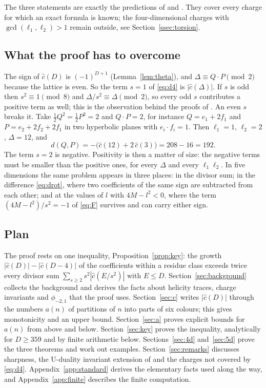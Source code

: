 \documentclass[11pt]{amsart}
\theoremstyle{definition}
\newcommand{\cc}{\hat c}
\begin{document}
The three statements are exactly the predictions of \cite[\S5]{BM13} and \cite[(5.30)]{Sen12}. They cover every charge for which an exact formula is known; the four-dimensional charges with $\gcd(\ell_1,\ell_2)>1$ remain outside, see Section~\ref{ssec:torsion}.

\subsection*{What the proof has to overcome}
The sign of $\cc(D)$ is $(-1)^{D+1}$ (Lemma~\ref{lem:theta}), and $\Delta\equiv Q\cdot P\pmod 2$ because the lattice is even. So the term $s=1$ of \eqref{eq:d4} is $|\cc(\Delta)|$. If $s$ is odd then $s^2\equiv1\pmod 8$ and $\Delta/s^2\equiv\Delta\pmod 2$, so every odd $s$ contributes a positive term as well; this is the observation behind the proofs of \cite{BM13}. An even $s$ breaks it. Take $\tfrac12Q^2=\tfrac12P^2=2$ and $Q\cdot P=2$, for instance $Q=e_1+2f_1$ and $P=e_2+2f_2+2f_1$ in two hyperbolic planes with $e_i\cdot f_i=1$. Then $\ell_1=1$, $\ell_2=2$, $\Delta=12$, and
\[
d(Q,P)=-\bigl(\cc(12)+2\,\cc(3)\bigr)=208-16=192 .
\]
The term $s=2$ is negative. Positivity is then a matter of size: the negative terms must be smaller than the positive ones, for every $\Delta$ and every $\ell_1\ell_2$. In five dimensions the same problem appears in three places: in the divisor sum; in the difference \eqref{eq:drot}, where two coefficients of the same sign are subtracted from each other; and at the values of $l$ with $4M-l^2<0$, where the term $(4M-l^2)/s^2=-1$ of \eqref{eq:F} survives and can carry either sign.

\subsection*{Plan}
The proof rests on one inequality, Proposition~\ref{prop:key}: the growth $|\cc(D)|-|\cc(D-4)|$ of the coefficients within a residue class exceeds twice every divisor sum $\sum_{s\ge2}s^2|\cc(E/s^2)|$ with $E\le D$. Section~\ref{sec:background} collects the background and derives the facts about helicity traces, charge invariants and $\phi_{-2,1}$ that the proof uses. Section~\ref{sec:c} writes $|\cc(D)|$ through the numbers $a(n)$ of partitions of $n$ into parts of six colours; this gives monotonicity and an upper bound. Section~\ref{sec:a} proves explicit bounds for $a(n)$ from above and below. Section~\ref{sec:key} proves the inequality, analytically for $D\ge 359$ and by finite arithmetic below. Sections~\ref{sec:4d} and~\ref{sec:5d} prove the three theorems and work out examples. Section~\ref{sec:remarks} discusses sharpness, the U-duality invariant extension of \cite{MMS99} and the charges not covered by \eqref{eq:d4}. Appendix~\ref{app:standard} derives the elementary facts used along the way, and Appendix~\ref{app:finite} describes the finite computation.
\end{document}
